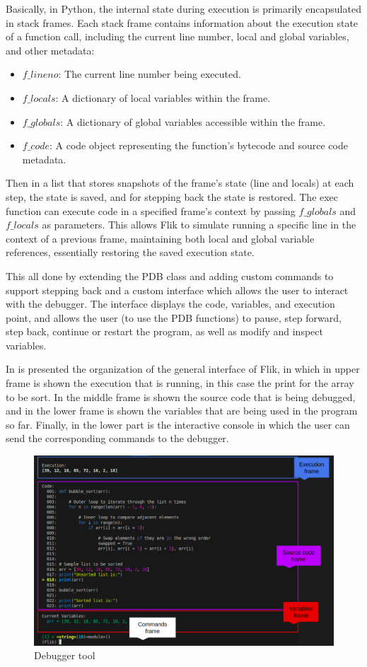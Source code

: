 Basically, in Python, the internal state during execution is primarily encapsulated in 
stack frames. Each stack frame contains information about the execution state of a function 
call, including the current line number, local and global variables, and other metadata:
\begin{itemize}
    \item $f\_lineno$: The current line number being executed.
    \item $f\_locals$: A dictionary of local variables within the frame.
    \item $f\_globals$: A dictionary of global variables accessible within the frame.
    \item $f\_code$: A code object representing the function's bytecode and source code metadata.
\end{itemize}
Then in a list that stores snapshots of the frame's state (line and locals) at each step, the state 
is saved, and for stepping back the state is restored. The exec function can execute code in a 
specified frame's context by passing $f\_globals$ and $f\_locals$ as parameters. This allows 
\ac{Flik} to simulate running a specific line in the context of a previous frame, maintaining 
both local and global variable references, essentially restoring the saved execution state.

This all done by extending the PDB class and adding custom commands to support stepping back
and a custom interface which allows the user to interact with the debugger. The interface 
displays the code, variables, and execution point, and allows the user (to use the \ac{PDB} 
functions) to pause, step forward, step back, continue or restart the program, as well as 
modify and inspect variables. 

In  is presented the organization of the general interface of \ac{Flik}, 
in which in upper frame is shown the execution that is running, in this case the print 
for the array to be sort. In the middle frame is shown the source code that is being 
debugged, and in the lower frame is shown the variables that are being used in the 
program so far. Finally, in the lower part is the interactive console in which the user can 
send the corresponding commands to the debugger.

\begin{figure}[h]
    \centering
    \includegraphics[width=1\textwidth]{figures/flik_interface.png}
    \caption{Debugger tool}
    \label{fig:debugger}
\end{figure}



\endinput

